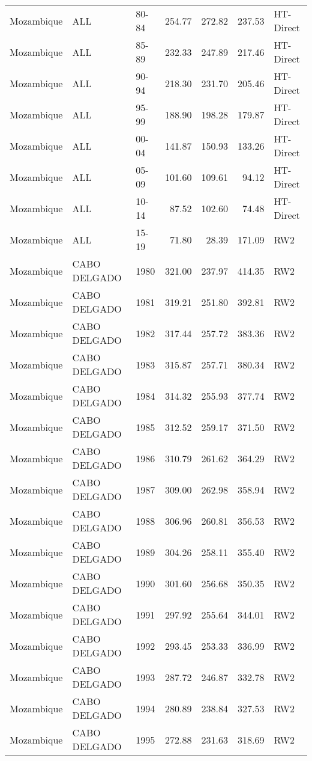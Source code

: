 \begin{longtable}{lllrrrl}
  Mozambique & ALL & 80-84 & 254.77 & 272.82 & 237.53 & HT-Direct \\ 
  Mozambique & ALL & 85-89 & 232.33 & 247.89 & 217.46 & HT-Direct \\ 
  Mozambique & ALL & 90-94 & 218.30 & 231.70 & 205.46 & HT-Direct \\ 
  Mozambique & ALL & 95-99 & 188.90 & 198.28 & 179.87 & HT-Direct \\ 
  Mozambique & ALL & 00-04 & 141.87 & 150.93 & 133.26 & HT-Direct \\ 
  Mozambique & ALL & 05-09 & 101.60 & 109.61 & 94.12 & HT-Direct \\ 
  Mozambique & ALL & 10-14 & 87.52 & 102.60 & 74.48 & HT-Direct \\ 
  Mozambique & ALL & 15-19 & 71.80 & 28.39 & 171.09 & RW2 \\ 
  Mozambique & CABO DELGADO & 1980 & 321.00 & 237.97 & 414.35 & RW2 \\ 
  Mozambique & CABO DELGADO & 1981 & 319.21 & 251.80 & 392.81 & RW2 \\ 
  Mozambique & CABO DELGADO & 1982 & 317.44 & 257.72 & 383.36 & RW2 \\ 
  Mozambique & CABO DELGADO & 1983 & 315.87 & 257.71 & 380.34 & RW2 \\ 
  Mozambique & CABO DELGADO & 1984 & 314.32 & 255.93 & 377.74 & RW2 \\ 
  Mozambique & CABO DELGADO & 1985 & 312.52 & 259.17 & 371.50 & RW2 \\ 
  Mozambique & CABO DELGADO & 1986 & 310.79 & 261.62 & 364.29 & RW2 \\ 
  Mozambique & CABO DELGADO & 1987 & 309.00 & 262.98 & 358.94 & RW2 \\ 
  Mozambique & CABO DELGADO & 1988 & 306.96 & 260.81 & 356.53 & RW2 \\ 
  Mozambique & CABO DELGADO & 1989 & 304.26 & 258.11 & 355.40 & RW2 \\ 
  Mozambique & CABO DELGADO & 1990 & 301.60 & 256.68 & 350.35 & RW2 \\ 
  Mozambique & CABO DELGADO & 1991 & 297.92 & 255.64 & 344.01 & RW2 \\ 
  Mozambique & CABO DELGADO & 1992 & 293.45 & 253.33 & 336.99 & RW2 \\ 
  Mozambique & CABO DELGADO & 1993 & 287.72 & 246.87 & 332.78 & RW2 \\ 
  Mozambique & CABO DELGADO & 1994 & 280.89 & 238.84 & 327.53 & RW2 \\ 
  Mozambique & CABO DELGADO & 1995 & 272.88 & 231.63 & 318.69 & RW2 \\ 

\end{longtable}
